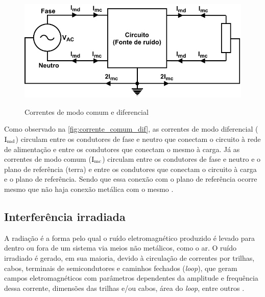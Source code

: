         \begin{figure}[H]
        	\centering
        	\caption{Correntes de modo comum e diferencial}
        	\includegraphics[scale=1]{pdf/outros/gerador_ruido.pdf}
        	\label{fig:corrente_comum_dif}
        \end{figure}
        
        Como observado na \autoref{fig:corrente_comum_dif}, as correntes de modo diferencial ($\text{I}_\text{md}$) circulam entre os condutores de fase e neutro que conectam o circuito à rede de alimentação e entre os condutores que conectam o mesmo à carga. Já as correntes de modo comum ($\text{I}_\text{mc}$) circulam entre os condutores de fase e neutro e o plano de referência (terra) e entre os condutores que conectam o circuito à carga e o plano de referência. Sendo que essa conexão com o plano de referência ocorre mesmo que não haja conexão metálica com o mesmo \cite{ref:EMC_phd_schlichting}. 
        
        \subsection{Interferência irradiada} \label{cap:fund_emc_intirrad}
        
        A radiação é a forma pelo qual o ruído eletromagnético produzido é levado para dentro ou fora de um sistema via meios não metálicos, como o ar. O ruído irradiado é gerado, em sua maioria, devido à circulação de correntes por trilhas, cabos, terminais de semicondutores e caminhos fechados (\textit{loop}), que geram campos eletromagnéticos com parâmetros dependentes da amplitude e frequência dessa corrente, dimensões das trilhas e/ou cabos, área do \textit{loop}, entre outros \cite{ref:EMC_msc_muriel}.
        
